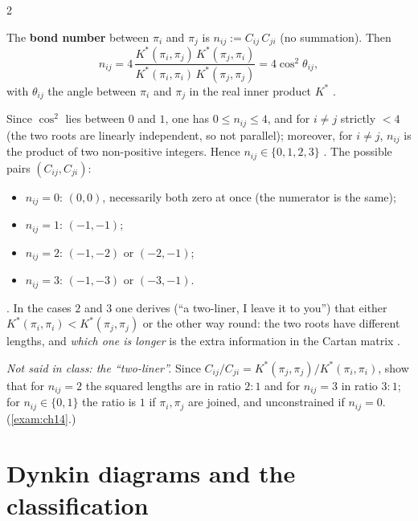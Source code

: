 \begin{paracol}{2}
\begin{definition}\label{def:cl-bond}
The \textbf{bond number} between $\pi_i$ and $\pi_j$ is $n_{ij}:=C_{ij}\,C_{ji}$ (no summation). Then
\[
  n_{ij}=4\,\frac{K^*(\pi_i,\pi_j)\,K^*(\pi_j,\pi_i)}{K^*(\pi_i,\pi_i)\,K^*(\pi_j,\pi_j)}=4\cos^2\theta_{ij},
\]
with $\theta_{ij}$ the angle between $\pi_i$ and $\pi_j$ in the real inner product $K^*$    .
\end{definition}
Since $\cos^2$ lies between $0$ and $1$, one has $0\le n_{ij}\le4$, and for $i\ne j$ strictly $<4$ (the two roots are linearly independent, so not parallel); moreover, for $i\ne j$, $n_{ij}$ is the product of two non-positive integers. Hence $n_{ij}\in\{0,1,2,3\}$     . The possible pairs $(C_{ij},C_{ji})$:
\begin{itemize}
  \item $n_{ij}=0$: $(0,0)$, necessarily both zero at once (the numerator is the same);
  \item $n_{ij}=1$: $(-1,-1)$;
  \item $n_{ij}=2$: $(-1,-2)$ or $(-2,-1)$;
  \item $n_{ij}=3$: $(-1,-3)$ or $(-3,-1)$.
\end{itemize}
   . In the cases $2$ and $3$ one derives (``a two-liner, I leave it to you'') that either $K^*(\pi_i,\pi_i)<K^*(\pi_j,\pi_j)$ or the other way round: the two roots have different lengths, and \emph{which one is longer} is the extra information in the Cartan matrix  .
\begin{exercise}\label{ex:cl-lengths}
\emph{Not said in class: the ``two-liner''.} Since $C_{ij}/C_{ji}=K^*(\pi_j,\pi_j)/K^*(\pi_i,\pi_i)$, show that for $n_{ij}=2$ the squared lengths are in ratio $2:1$ and for $n_{ij}=3$ in ratio $3:1$; for $n_{ij}\in\{0,1\}$ the ratio is $1$ if $\pi_i,\pi_j$ are joined, and unconstrained if $n_{ij}=0$. (\cref{exam:ch14}.)
\end{exercise}

\section{Dynkin diagrams and the classification}\label{sec:cl-dynkin}


\end{paracol}
